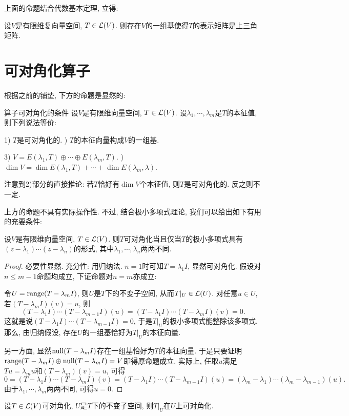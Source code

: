 上面的命题结合代数基本定理, 立得: 

\begin{corollary}{}
	设$V$是有限维复向量空间, $T \in \mathcal{L} (V)$. 则存在$V$的一组基使得$T$的表示矩阵是上三角矩阵. 
\end{corollary}



\newpage
\section{可对角化算子}

根据之前的铺垫, 下方的命题是显然的: 

\begin{proposition}{算子可对角化的条件}
	设$V$是有限维向量空间, $T \in \mathcal{L} (V)$. 设$\lambda _1,\cdots ,\lambda _m$是$T$的本征值, 则下列说法等价: 
	
	1) $T$是可对角化的. ) $T$的本征向量构成$V$的一组基. 
	
	3) $V=E(\lambda _1,T) \oplus \cdots \oplus E(\lambda _m,T)$. ) $\dim V = \dim E(\lambda _1,T) + \cdots + \dim E(\lambda _m,\lambda)$. 
\end{proposition}

注意到2)部分的直接推论: 若$T$恰好有$\dim V$个本征值, 则$T$是可对角化的. 反之则不一定. 

上方的命题不具有实际操作性. 不过, 结合极小多项式理论, 我们可以给出如下有用的充要条件: 

\begin{proposition}{}
	设$V$是有限维向量空间, $T \in \mathcal{L} (V)$. 则$T$可对角化当且仅当$T$的极小多项式具有$(z-\lambda _1)\cdots (z-\lambda _n)$的形式, 其中$\lambda _1,\cdots ,\lambda _n$两两不同. 
\end{proposition}
\begin{proof}
	必要性显然. 充分性: 用归纳法. $n=1$时可知$T=\lambda _1I$, 显然可对角化. 假设对$n \leq m-1$命题均成立, 下证命题对$n=m$亦成立: 
	
	令$U=\operatorname{range} (T-\lambda _mI)$, 则$U$是$T$下的不变子空间, 从而$T|_U \in \mathcal{L} (U)$. 对任意$u \in U$, 若$(T-\lambda _mI)(v)=u$, 则$$(T-\lambda _1I) \cdots (T-\lambda _{m-1}I)(u) = (T-\lambda _1I) \cdots (T-\lambda _mI)(v) = 0.$$
	这就是说$(T-\lambda _1I) \cdots (T-\lambda _{m-1}I)=0$, 于是$T|_U$的极小多项式能整除该多项式. 那么, 由归纳假设, 存在$U$的一组基恰好为$T|_U$的本征向量. 
	
	另一方面, 显然$\operatorname{null} (T-\lambda _mI)$存在一组基恰好为$T$的本征向量. 于是只要证明$\operatorname{range} (T-\lambda _mI) \oplus \operatorname{null} (T-\lambda _mI) = V$即得原命题成立. 实际上, 任取$u$满足$Tu=\lambda _mu$和$(T-\lambda _m)(v)=u$, 可得$$0 = (T-\lambda _1I) \cdots (T-\lambda _{m}I)(v) = (T-\lambda _1I) \cdots (T-\lambda _{m-1}I)(u) = (\lambda _m-\lambda _1) \cdots (\lambda _m-\lambda _{m-1}) (u).$$
	由于$\lambda _1,\cdots ,\lambda _m$两两不同, 可得$u=0$. 
\end{proof}

\begin{corollary}{}
	设$T \in \mathcal{L} (V)$可对角化, $U$是$T$下的不变子空间, 则$T|_U$在$U$上可对角化. 
\end{corollary}
















